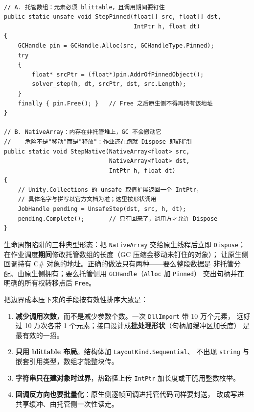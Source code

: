 \documentclass[12pt,a4paper,fontset=fandol]{ctexbook}
\newcommand{\Tp}[1]{\texttt{#1}}
\newcommand{\Lang}[1]{\textsf{#1}}
\begin{document}
\begin{lstlisting}[style=cppstyle, caption={两种正确的传数据写法：钉住托管数组，与直接交出 NativeArray 的裸指针}, label={lst:ch11-marshal}, framexleftmargin=12pt, framexrightmargin=12pt]

// A. 托管数组：元素必须 blittable，且调用期间要钉住
public static unsafe void StepPinned(float[] src, float[] dst,
                                     IntPtr h, float dt)
{
    GCHandle pin = GCHandle.Alloc(src, GCHandleType.Pinned);
    try
    {
        float* srcPtr = (float*)pin.AddrOfPinnedObject();
        solver_step(h, dt, srcPtr, dst, src.Length);
    }
    finally { pin.Free(); }   // Free 之后原生侧不得再持有该地址
}

// B. NativeArray：内存在非托管堆上，GC 不会搬动它
//    危险不是"移动"而是"释放"：作业还在跑就 Dispose 即野指针
public static void StepNative(NativeArray<float> src,
                              NativeArray<float> dst,
                              IntPtr h, float dt)
{
    // Unity.Collections 的 unsafe 取值扩展返回一个 IntPtr，
    // 具体名字与拼写以官方文档为准；这里按形状调用
    JobHandle pending = UnsafeStep(dst, src, h, dt);
    pending.Complete();       // 只有回来了，调用方才允许 Dispose
}
\end{lstlisting}

生命周期陷阱的三种典型形态：把 \Tp{NativeArray} 交给原生线程后立即 \Tp{Dispose}；
在作业调度\textbf{期间}修改托管数组的长度（GC 压缩会移动未钉住的对象）；
让原生侧回调持有 \Lang{C\#} 对象的地址。正确的做法只有两种——要么整段数据是
非托管分配、由原生侧拥有；要么托管侧用 \Tp{GCHandle}（\Tp{Alloc} 加 \Tp{Pinned}）
交出句柄并在明确的所有权转移点后 \Tp{Free}。

把边界成本压下来的手段按有效性排序大致是：

\begin{enumerate}
  \item \textbf{减少调用次数}，而不是减少参数个数。一次 \Tp{DllImport} 带 10 万个元素，
        远好过 10 万次各带 1 个元素；接口设计成\textbf{批处理形状}（句柄加缓冲区加长度）
        是最有效的一招。
  \item \textbf{只用 blittable 布局}。结构体加 \Tp{LayoutKind.Sequential}、
        不出现 \Tp{string} 与嵌套引用类型，数组才能整块传。
  \item \textbf{字符串只在建对象时过界}，热路径上传 \Tp{IntPtr} 加长度或干脆用整数枚举。
  \item \textbf{回调反方向也要批量化}：原生侧逐帧回调进托管代码同样要封送，
        改成写进共享缓冲、由托管侧一次性读走。
\end{enumerate}
\end{document}
